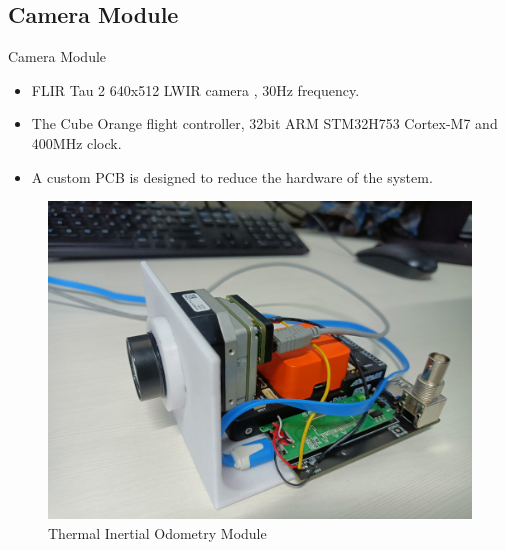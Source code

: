 \documentclass[10pt]{beamer}
\begin{document}
\subsection*{Camera Module}
\begin{frame}{Camera Module}

    \begin{itemize}
        \item FLIR Tau 2 640x512 LWIR camera , 30Hz frequency. 
        \item The Cube Orange flight controller, 32bit ARM STM32H753 Cortex-M7 and 400MHz clock.
        \item A custom PCB is designed to reduce the hardware of the system.
    \end{itemize}

    \begin{figure}[!ht]
        \centering
        \includegraphics[scale=0.045]{TIO_module.jpg}
        \caption{Thermal Inertial Odometry Module}
        \label{fig:TIO_module}
    \end{figure}
\end{frame}
\end{document}
